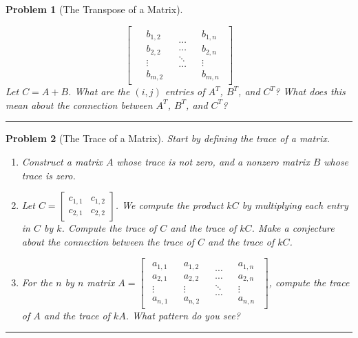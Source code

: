 \documentclass[letterpaper,oneside]{book}%
\theoremstyle{plain}
\theoremstyle{box}
\theoremstyle{problem}
\newtheorem{problemnum}{Problem}[chapter]
\newenvironment{problem}[1][]{\begin{problemnum}[#1]}{\end{problemnum}\nopagebreak\hrule\bigskip}
\newcommand{\nvec}[1]{\begin{matrix} #1 \end{matrix}}
\begin{document}
\begin{problem}[The Transpose of a Matrix]
\begin{enumerate}
$$\begin{bmatrix}
&\nvec{b_{1,2}\\b_{2,2}\\\vdots\\b_{m,2}}
&\nvec{\cdots\\\cdots\\\ddots\\\cdots}
&\nvec{b_{1,n}\\b_{2,n}\\\vdots\\b_{m,n}}
\end{bmatrix}$$
Let $C=A+B$. What are the $(i,j)$ entries of $A^T$, $B^T$, and $C^T$? What does this mean about the connection between $A^T$, $B^T$, and $C^T$?
\end{enumerate}
 
\end{problem}

\newcommand{\tr}{\text{tr}}
\begin{problem}[The Trace of a Matrix]
Start by  defining the trace of a matrix. 
\begin{enumerate}
 \item Construct a matrix $A$ whose trace is not zero, and a nonzero matrix $B$ whose trace is zero.
 \item Let $C=\begin{bmatrix}c_{1,1}&c_{1,2}\\c_{2,1}&c_{2,2}\end{bmatrix}$. We compute the product $kC$ by multiplying each entry in $C$ by $k$. Compute the trace of $C$ and the trace of $kC$. Make a conjecture about the connection between the trace of $C$ and the trace of $kC$. 
 \item For the $n$ by $n$ matrix
$A
=\begin{bmatrix}
\nvec{a_{1,1}\\a_{2,1}\\\vdots\\a_{n,1}}
&\nvec{a_{1,2}\\a_{2,2}\\\vdots\\a_{n,2}}
&\nvec{\cdots\\\cdots\\\ddots\\\cdots}
&\nvec{a_{1,n}\\a_{2,n}\\\vdots\\a_{n,n}}
\end{bmatrix}
$, compute the trace of $A$ and the trace of $kA$. What pattern do you see?
\end{enumerate}
\end{problem}
\end{document}
